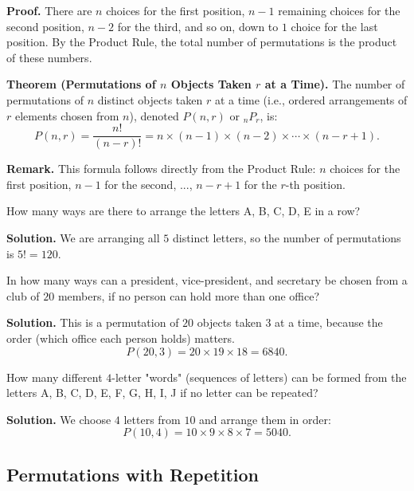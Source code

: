 \documentclass[11pt,a4paper]{article}
\begin{document}
\textbf{Proof.} There are $n$ choices for the first position, $n-1$ remaining choices for the second position, $n-2$ for the third, and so on, down to $1$ choice for the last position. By the Product Rule, the total number of permutations is the product of these numbers.

\textbf{Theorem (Permutations of $n$ Objects Taken $r$ at a Time).} The number of permutations of $n$ distinct objects taken $r$ at a time (i.e., ordered arrangements of $r$ elements chosen from $n$), denoted $P(n, r)$ or ${}_nP_r$, is:
\begin{equation*}
    P(n, r) = \frac{n!}{(n-r)!} = n \times (n-1) \times (n-2) \times \cdots \times (n-r+1).
\end{equation*}

\textbf{Remark.} This formula follows directly from the Product Rule: $n$ choices for the first position, $n-1$ for the second, ..., $n-r+1$ for the $r$-th position.

\begin{example}
How many ways are there to arrange the letters A, B, C, D, E in a row?

\textbf{Solution.} We are arranging all $5$ distinct letters, so the number of permutations is $5! = 120$.
\end{example}

\begin{example}
In how many ways can a president, vice-president, and secretary be chosen from a club of $20$ members, if no person can hold more than one office?

\textbf{Solution.} This is a permutation of $20$ objects taken $3$ at a time, because the order (which office each person holds) matters.
\begin{equation*}
    P(20, 3) = 20 \times 19 \times 18 = 6840.
\end{equation*}
\end{example}

\begin{example}
How many different $4$-letter "words" (sequences of letters) can be formed from the letters A, B, C, D, E, F, G, H, I, J if no letter can be repeated?

\textbf{Solution.} We choose $4$ letters from $10$ and arrange them in order:
\begin{equation*}
    P(10, 4) = 10 \times 9 \times 8 \times 7 = 5040.
\end{equation*}
\end{example}

\subsection{Permutations with Repetition}
\end{document}
